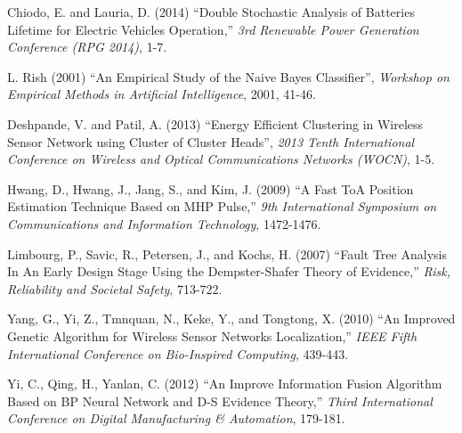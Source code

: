 \documentclass[12pt]{uthesis-v12}  %
\begin{document}
\begin{thebibliography}{00}
Chiodo, E. and Lauria, D. (2014) ``Double Stochastic Analysis of Batteries Lifetime for Electric Vehicles Operation,'' {\it 3rd Renewable Power Generation Conference (RPG 2014)}, 1-7.


L. Rish (2001) ``An Empirical Study of the Naive Bayes Classifier'', {\it Workshop on Empirical Methods in Artificial Intelligence}, 2001, 41-46.

Deshpande, V. and Patil, A. (2013) ``Energy Efficient Clustering in Wireless Sensor Network using Cluster of Cluster Heads'', {\it 2013 Tenth International Conference on Wireless and Optical Communications Networks (WOCN)}, 1-5.


Hwang, D., Hwang, J., Jang, S., and Kim, J. (2009) ``A Fast ToA Position Estimation Technique Based on MHP Pulse,'' {\it 9th International Symposium on Communications and Information Technology}, 1472-1476.


Limbourg, P., Savic, R., Petersen, J., and Kochs, H. (2007) ``Fault Tree Analysis In An Early Design Stage Using the Dempster-Shafer Theory of Evidence,'' {\it Risk, Reliability and Societal Safety}, 713-722.

Yang, G., Yi, Z., Tmnquan, N., Keke, Y., and Tongtong, X. (2010) ``An Improved Genetic Algorithm for Wireless Sensor Networks Localization,'' {\it IEEE Fifth International Conference on Bio-Inspired Computing}, 439-443.

Yi, C., Qing, H., Yanlan, C. (2012) ``An Improve Information Fusion Algorithm Based on BP Neural Network and D-S Evidence Theory,'' {\it Third International Conference on Digital Manufacturing \& Automation}, 179-181.



\end{thebibliography}
\end{document}
